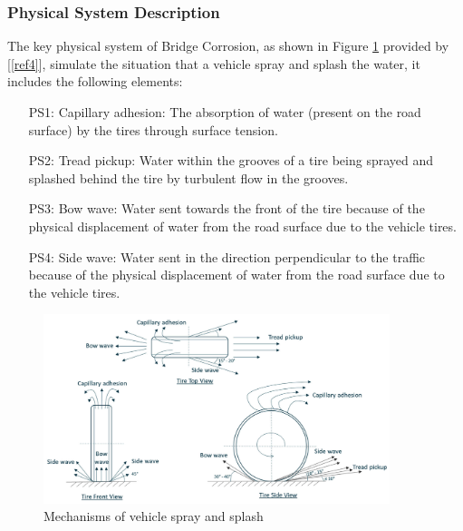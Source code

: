 \documentclass[12pt]{article}
\newcommand{\reref}[1]{\ref{#1}}
\begin{document}
\subsubsection{Physical System Description} \label{sec_phySystDescrip}


The key physical system of Bridge Corrosion, as shown in Figure \ref{4mechanism} provided by [\reref{ref4}], simulate the situation that a vehicle spray and splash the water, it includes the following elements:

\begin{itemize}

\item[PS1:] Capillary adhesion: The absorption of water (present on the road surface) by the tires through surface tension.

\item[PS2:] Tread pickup: Water within the grooves of a tire being sprayed and splashed behind the tire by turbulent flow in the grooves.

\item[PS3:] Bow wave: Water sent towards the front of the tire because of the physical displacement of water from the road surface due to the vehicle tires.

\item[PS4:] Side wave: Water sent in the direction perpendicular to the traffic because of the physical displacement of water from the road surface due to the vehicle tires.

\end{itemize}


\begin{figure}[h!]
\begin{center}
\includegraphics[width=0.9\textwidth]{phymodel}
\caption{\label{4mechanism} Mechanisms of vehicle spray and splash}

\end{center}
\end{figure}
\end{document}
